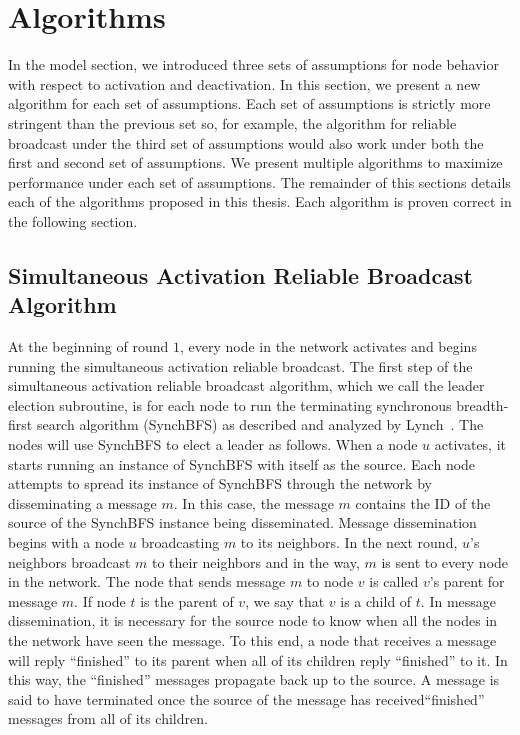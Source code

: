 \documentclass[english]{article}
\begin{document}
\section{Algorithms}

In the model section, we introduced three sets of assumptions for node behavior with respect to activation and deactivation. In this section, we present a new algorithm for each set of assumptions. Each set of assumptions is strictly more stringent than the previous set so, for example, the algorithm for reliable broadcast under the third set of assumptions would also work under both the first and second set of assumptions. We present multiple algorithms to maximize performance under each set of assumptions. The remainder of this sections details each of the algorithms proposed in this thesis. Each algorithm is proven correct in the following section. 


  \subsection {Simultaneous Activation Reliable Broadcast Algorithm}

At the beginning of round $1$, every node in the network activates and begins running the simultaneous activation reliable broadcast. The first step of the simultaneous activation reliable broadcast algorithm, which we call the leader election subroutine, is for each node to run the terminating synchronous breadth-first search algorithm (SynchBFS) as described and analyzed by Lynch~\cite{Lynch:1996}. The nodes will use SynchBFS to elect a leader as follows. When a node $u$ activates, it starts running an instance of SynchBFS with itself as the source. Each node attempts to spread its instance of SynchBFS through the network by disseminating a message $m$. In this case, the message $m$ contains the ID of the source of the SynchBFS instance being disseminated. Message dissemination begins with a node $u$ broadcasting $m$ to its neighbors. In the next round, $u$'s neighbors broadcast $m$ to their neighbors and in the way, $m$ is sent to every node in the network. The node that sends message $m$ to node $v$ is called $v$'s parent for message $m$. If node $t$ is the parent of $v$, we say that $v$ is a child of $t$. In message dissemination, it is necessary for the source node to know when all the nodes in the network have seen the message. To this end, a node that receives a message will reply ``finished'' to its parent when all of its children reply ``finished'' to it. In this way, the ``finished'' messages propagate back up to the source. A message is said to have terminated once the source of the message has received``finished'' messages from all of its children.
\end{document}
